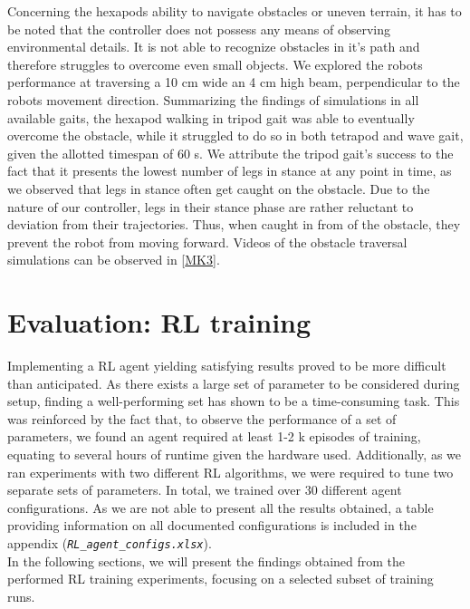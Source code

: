 Concerning the hexapods ability to navigate obstacles or uneven terrain, it has to be noted that the controller does not possess any means of observing environmental details.
It is not able to recognize obstacles in it's path and therefore struggles to overcome even small objects.
We explored the robots performance at traversing a 10 cm wide an 4 cm high beam, perpendicular to the robots movement direction.
Summarizing the findings of simulations in all available gaits, the hexapod walking in tripod gait was able to eventually overcome the obstacle, while it struggled to do so in both tetrapod and wave gait, given the allotted timespan of 60 s.
We attribute the tripod gait's success to the fact that it presents the lowest number of legs in stance at any point in time, as we observed that legs in stance often get caught on the obstacle.
Due to the nature of our controller, legs in their stance phase are rather reluctant to deviation from their trajectories.
Thus, when caught in from of the obstacle, they prevent the robot from moving forward.
Videos of the obstacle traversal simulations can be observed in [\hyperref[vid: MK1]{MK3}].


\section{Evaluation: RL training}

Implementing a RL agent yielding satisfying results proved to be more difficult than anticipated.
As there exists a large set of parameter to be considered during setup, finding a well-performing set has shown to be a time-consuming task.
This was reinforced by the fact that, to observe the performance of a set of parameters, we found an agent required at least 1-2 k episodes of training, equating to several hours of runtime given the hardware used.
Additionally, as we ran experiments with two different RL algorithms, we were required to tune two separate sets of parameters.
In total, we trained over 30 different agent configurations.
As we are not able to present all the results obtained, a table providing information on all documented configurations is included in the appendix (\emph{\nolinkurl{RL_agent_configs.xlsx}}).\\
In the following sections, we will present the findings obtained from the performed RL training experiments, focusing on a selected subset of training runs.

